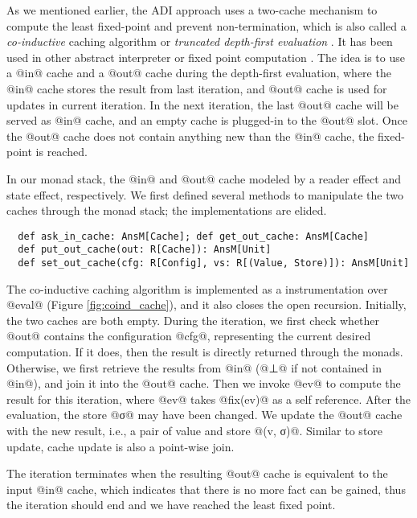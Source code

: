 As we mentioned earlier, the ADI approach uses a two-cache mechanism to
compute the least fixed-point and prevent non-termination, which is also called a
\textit{co-inductive} caching algorithm or \textit{truncated depth-first
evaluation} \cite{Rosendahl:AbsIntPL}. It has been used in other abstract
interpreter or fixed point computation
\cite{DBLP:journals/pacmpl/DaraisLNH17, Wei:2018:RAA:3243631.3236800,
  Rosendahl:AbsIntPL}. The idea is to use a @in@ cache and a @out@ cache during
the depth-first evaluation, where the @in@ cache stores the result from last
iteration, and @out@ cache is used for updates in current iteration. In the next
iteration, the last @out@ cache will be served as @in@ cache, and an empty cache
is plugged-in to the @out@ slot. Once the @out@ cache does not contain anything
new than the @in@ cache, the fixed-point is reached.

In our monad stack, the @in@ and @out@ cache modeled by a reader effect and
state effect, respectively. We first defined several methods to manipulate
the two caches through the monad stack; the implementations are elided.
\begin{lstlisting}
  def ask_in_cache: AnsM[Cache]; def get_out_cache: AnsM[Cache]
  def put_out_cache(out: R[Cache]): AnsM[Unit]
  def set_out_cache(cfg: R[Config], vs: R[(Value, Store)]): AnsM[Unit]
\end{lstlisting}

The co-inductive caching algorithm is implemented as a instrumentation over
@eval@ (Figure \ref{fig:coind_cache}), and it also closes the open recursion.
Initially, the two caches are both empty.
During the iteration, we first check whether @out@ contains the configuration
@cfg@, representing the current desired computation. If it does, then the result
is directly returned through the monads.
Otherwise, we first retrieve the results from @in@ (@⊥@ if not contained in
@in@), and join it into the @out@ cache.
Then we invoke @ev@ to compute the result for this iteration, where @ev@ takes
@fix(ev)@ as a self reference.
After the evaluation, the store @σ@ may have been changed. We update the
@out@ cache with the new result, i.e., a pair of value and store @(v, σ)@.
Similar to store update, cache update is also a point-wise join.

The iteration terminates when the resulting @out@ cache is equivalent to the
input @in@ cache, which indicates that there is no more fact can be gained, thus
the iteration should end and we have reached the least fixed point.

